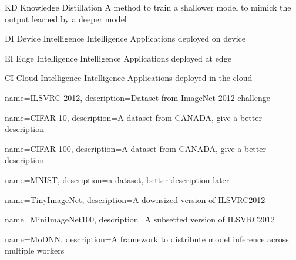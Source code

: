 	{KD}
	{Knowledge Distillation}
	{A method to train a shallower model to mimick the output learned by a deeper model}
	

{DI}
{Device Intelligence}
{Intelligence Applications deployed on device}

	{EI}
	{Edge Intelligence}
	{Intelligence Applications deployed at edge}
	
{CI}
{Cloud Intelligence}
{Intelligence Applications deployed in the cloud}
	

{
	name={ILSVRC 2012},
	description={Dataset from ImageNet 2012 challenge}
}

{
	name={CIFAR-10},
	description={A dataset from CANADA, give a better description}
}

{
	name={CIFAR-100},
	description={A dataset from CANADA, give a better description}
}

{
	name={MNIST},
	description={a dataset, better description later}
}

{
	name={TinyImageNet},
	description={A downsized version of ILSVRC2012}
}

{
	name={MiniImageNet100},
	description={A subsetted version of ILSVRC2012}
}

{
	name={MoDNN},
	description={A framework to distribute model inference across multiple workers}
}



